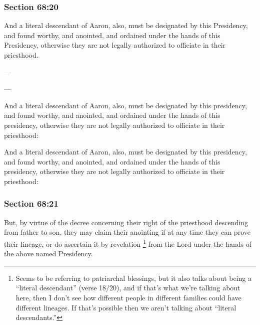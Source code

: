 	\subsubsection{Section 68:20} %
		\label{DC68-20}

		And a literal descendant of Aaron, also, must be designated by this Presidency, and found worthy, and anointed, and ordained under the hands of this Presidency, otherwise they are not legally authorized to officiate in their priesthood.

		\begin{framed}
		\scriptsize
			\begin{compactdesc}
				\item[JSP] ---
				\item[EMS] ---
				\item[EMS-R] And a literal descendant of Aaron, also, must be designated by this presidency, and found worthy, and anointed, and ordained under the hands of this presidency, otherwise they are not legally authorized to officiate in their priesthood:
				\item[DC 1835] And a literal descendant of Aaron, also, must be designated by this presidency, and found worthy, and anointed, and ordained under the hands of this presidency, otherwise they are not legally authorized to officiate in their priesthood:
			\end{compactdesc}
		\end{framed}

	\subsubsection{Section 68:21} %
		\label{DC68-21}

		But, by virtue of the decree concerning their right of the priesthood descending from father to son, they may claim their anointing if at any time they can prove their lineage, or do ascertain it by revelation%
			\footnote{%
				Seems to be referring to patriarchal blessings, but it also talks about being a ``literal descendant'' (verse 18/20), and if that's what we're talking about here, then I don't see how different people in different families could have different lineages. If that's possible then we aren't talking about ``literal descendants.''
				}
		from the Lord under the hands of the above named Presidency.

